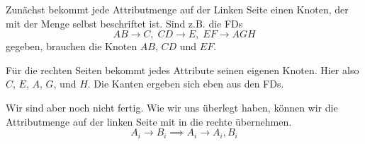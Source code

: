 \documentclass[a4paper, ngerman]{article}
\begin{document}
Zunächst bekommt jede Attributmenge
auf der Linken Seite einen Knoten,
der mit der Menge selbst beschriftet ist.
Sind z.B. die FDs
$$
    AB \to C,\;
    CD \to E,\;
    EF \to AGH
$$
gegeben, brauchen die Knoten $AB$, $CD$ und $EF$.
\begin{center}
\end{center}
Für die rechten Seiten bekommt
jedes Attribute seinen eigenen Knoten.
Hier also $C$, $E$, $A$, $G$, und $H$.
Die Kanten ergeben sich eben aus den FDs.
\begin{center}
\end{center}
Wir sind aber noch nicht fertig.
Wie wir uns überlegt haben,
können wir die Attributmenge
auf der linken Seite mit in die rechte übernehmen.
$$
    A_i \to B_i \implies
    A_i \to A_i, B_i 
$$
\end{document}
